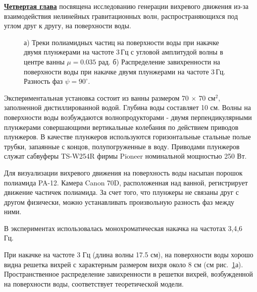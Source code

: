 \underline{\textbf{Четвертая глава}} посвящена исследованию генерации вихревого движения из-за взаимодействия нелинейных гравитационных волн, распространяющихся под углом друг к другу, на поверхности воды.

\begin{figure}[ht]
 \begin{minipage}[ht]{0.49\linewidth}
 \end{minipage}
 \hfill
 \begin{minipage}[ht]{0.49\linewidth}
 \end{minipage}
 \caption{а) Треки полиамидных частиц на поверхности воды при накачке двумя плунжерами на частоте 3\,Гц с угловой амплитудой волны в центре ванны $\mu = 0.035$ рад. б) Распределение завихренности на поверхности воды при накачке двумя плунжерами на частоте 3\,Гц. Разность фаз $\psi = 90^\circ$.}
 \label{img:vort_3Hz} 
\end{figure}
 
Экспериментальная установка состоит из ванны размером 70 $\times$ 70 см$^2$, заполненной дистиллированной водой. Глубина воды составляет 10 см. Волны на поверхности воды возбуждаются волнопродукторами - двумя перпендикулярными плунжерами совершающими вертикальные колебания по действием приводов плунжеров. В качестве плунжеров используются горизонтальные стальные полые трубки, запаянные с концов, полупогруженные в воду. Приводами плунжеров служат сабвуферы TS-W254R фирмы Pioneer номинальной мощностью 250 Вт. 


Для визуализации вихревого движения на поверхность воды насыпан порошок полиамида PA-12. Камера Canon 70D, расположенная над ванной, регистрирует движение частичек полиамида.
За счет того, что плунжеры не связаны друг с другом физически, можно устанавливать произвольную разность фаз между ними.

В экспериментах использовалась монохроматическая накачка на частотах 3,4,6 Гц.

При накачке на частоте 3 Гц (длина волны 17.5 см), на поверхности воды хорошо видна решетка вихрей с характерным размером вихря около 8 см (см рис.~\ref{img:vort_3Hz}а). Пространственное распределение завихренности в решетки вихрей, возбужденной на поверхности воды, соответствует теоретической модели.

